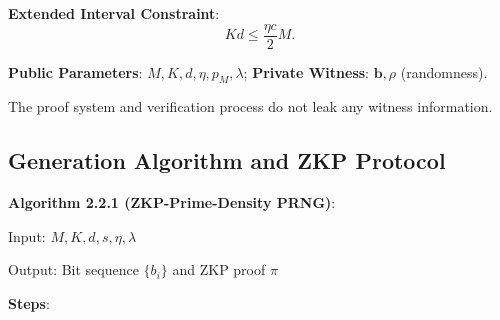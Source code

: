 \documentclass[12pt]{article}
\theoremstyle{plain}
\theoremstyle{definition}
\begin{document}
\textbf{Extended Interval Constraint}:
\[
Kd \le \frac{\eta c}{2} M.
\]

\textbf{Public Parameters}: $M, K, d, \eta, p_M, \lambda$; \textbf{Private Witness}: $\mathbf{b}, \rho$ (randomness).

The proof system and verification process do not leak any witness information.

\subsection{Generation Algorithm and ZKP Protocol}

\textbf{Algorithm 2.2.1 (ZKP-Prime-Density PRNG)}:

Input: $M, K, d, s, \eta, \lambda$

Output: Bit sequence $\{b_i\}$ and ZKP proof $\pi$

\textbf{Steps}:
\end{document}
